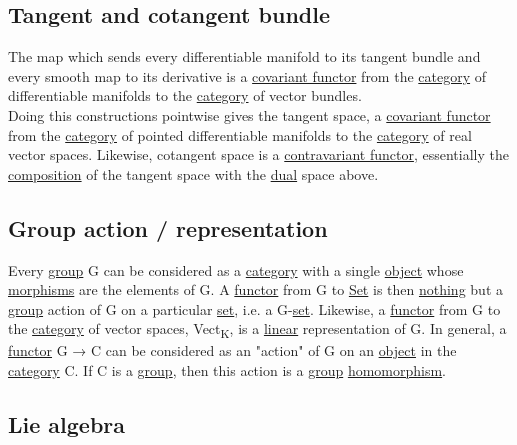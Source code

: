 \documentclass[11pt]{article}
\begin{document}
\subsection{\label{org0de6d79}Tangent and cotangent bundle}
\label{sec:orgd46ab8b}

The map which sends every differentiable manifold to its tangent bundle and every smooth map to its derivative is a \hyperref[orgf6f99b5]{covariant functor} from the \hyperref[org0450535]{category} of differentiable manifolds to the \hyperref[org0450535]{category} of vector bundles.\\

Doing this constructions pointwise gives the tangent space, a \hyperref[orgf6f99b5]{covariant functor} from the \hyperref[org0450535]{category} of pointed differentiable manifolds to the \hyperref[org0450535]{category} of real vector spaces. Likewise, cotangent space is a \hyperref[orge5e36a5]{contravariant functor}, essentially the \hyperref[orga128e7f]{composition} of the tangent space with the \hyperref[org28cefbe]{dual} space above.\\

\subsection{\label{org7818313}Group action / representation}
\label{sec:org7c2f2d8}

Every \hyperref[orgc937439]{group} G can be considered as a \hyperref[org0450535]{category} with a single \hyperref[org4be0e9d]{object} whose \hyperref[org6c2fa5c]{morphisms} are the elements of G. A \hyperref[orgf2f6841]{functor} from G to \hyperref[org1faf06d]{Set} is then \hyperref[org35c2c9d]{nothing} but a \hyperref[orgc937439]{group} action of G on a particular \hyperref[org1faf06d]{set}, i.e. a G-\hyperref[org1faf06d]{set}. Likewise, a \hyperref[orgf2f6841]{functor} from G to the \hyperref[org0450535]{category} of vector spaces, Vect\textsubscript{K}, is a \hyperref[orgbbe89e9]{linear} representation of G. In general, a \hyperref[orgf2f6841]{functor} G → C can be considered as an "action" of G on an \hyperref[org4be0e9d]{object} in the \hyperref[org0450535]{category} C. If C is a \hyperref[orgc937439]{group}, then this action is a \hyperref[orgc937439]{group} \hyperref[org4991058]{homomorphism}.\\

\subsection{\label{org8a581cf}Lie algebra}
\label{sec:orgc13acee}
\end{document}
